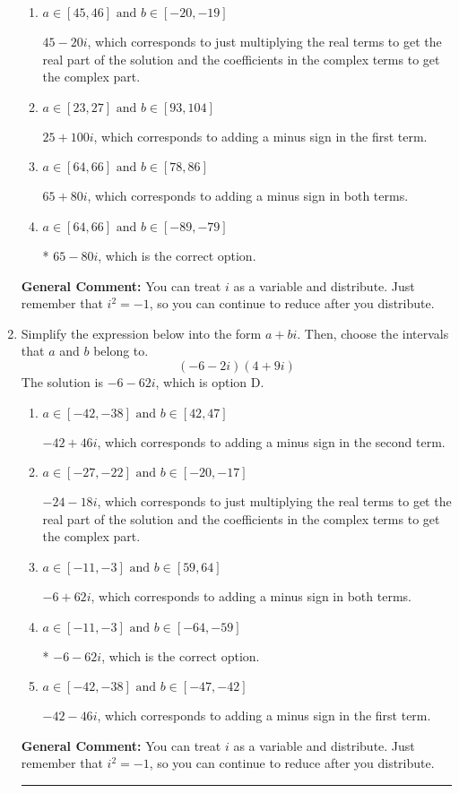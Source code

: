 \documentclass{extbook}[14pt]
\newcommand{\litem}[1]{\item #1

\rule{\textwidth}{0.4pt}}
\begin{document}
\begin{enumerate}
{\begin{enumerate}[label=\Alph*.]
 $25 - 100 i$, which corresponds to adding a minus sign in the second term.
\item \( a \in [45, 46] \text{ and } b \in [-20, -19] \)

 $45 - 20 i$, which corresponds to just multiplying the real terms to get the real part of the solution and the coefficients in the complex terms to get the complex part.
\item \( a \in [23, 27] \text{ and } b \in [93, 104] \)

 $25 + 100 i$, which corresponds to adding a minus sign in the first term.
\item \( a \in [64, 66] \text{ and } b \in [78, 86] \)

 $65 + 80 i$, which corresponds to adding a minus sign in both terms.
\item \( a \in [64, 66] \text{ and } b \in [-89, -79] \)

* $65 - 80 i$, which is the correct option.
\end{enumerate}

\textbf{General Comment:} You can treat $i$ as a variable and distribute. Just remember that $i^2=-1$, so you can continue to reduce after you distribute.
}
\litem{
Simplify the expression below into the form $a+bi$. Then, choose the intervals that $a$ and $b$ belong to.
\[ (-6 - 2 i)(4 + 9 i) \]The solution is \( -6 - 62 i \), which is option D.\begin{enumerate}[label=\Alph*.]
\item \( a \in [-42, -38] \text{ and } b \in [42, 47] \)

 $-42 + 46 i$, which corresponds to adding a minus sign in the second term.
\item \( a \in [-27, -22] \text{ and } b \in [-20, -17] \)

 $-24 - 18 i$, which corresponds to just multiplying the real terms to get the real part of the solution and the coefficients in the complex terms to get the complex part.
\item \( a \in [-11, -3] \text{ and } b \in [59, 64] \)

 $-6 + 62 i$, which corresponds to adding a minus sign in both terms.
\item \( a \in [-11, -3] \text{ and } b \in [-64, -59] \)

* $-6 - 62 i$, which is the correct option.
\item \( a \in [-42, -38] \text{ and } b \in [-47, -42] \)

 $-42 - 46 i$, which corresponds to adding a minus sign in the first term.
\end{enumerate}

\textbf{General Comment:} You can treat $i$ as a variable and distribute. Just remember that $i^2=-1$, so you can continue to reduce after you distribute.
}
\end{enumerate}
\end{document}
